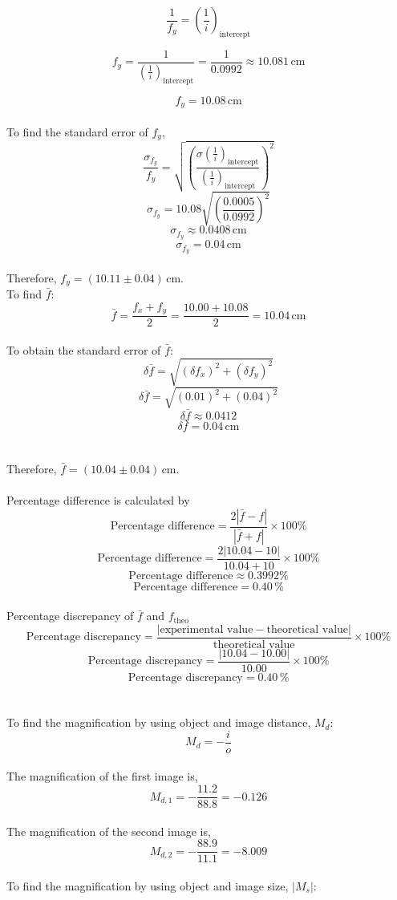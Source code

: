 \documentclass[a4paper,11pt]{article}
\begin{document}
\[ \frac{1}{f_y} = (\frac{1}{i})_{\text{intercept}} \]

\[ f_y = \frac{1}{(\frac{1}{i})_{\text{intercept}}} = \frac{1}{0.0992} \approx 10.081\, \text{cm} \]

\[ f_y = 10.08\, \text{cm} \]
~\\
To find the standard error of $f_y$,
\[ \frac{\sigma_{f_y}}{f_y} = \sqrt{\left( \frac{\sigma(\frac{1}{i})_{\text{intercept}}}{(\frac{1}{i})_{\text{intercept}}} \right)^2} \]
\[ \sigma_{f_y}= 10.08\sqrt{\left( \frac{0.0005}{0.0992} \right)^2} \]
\[ \sigma_{f_y}\approx 0.0408\, \text{cm} \]
\[ \sigma_{f_y} = 0.04\, \text{cm} \]
~\\
Therefore, $f_y = (10.11 \pm 0.04)\, \text{cm}$.
~\\
To find $\bar{f}$:
\[ \bar{f} = \frac{f_x + f_y}{2} = \frac{10.00 + 10.08}{2} = 10.04\,\text{cm} \]
~\\
To obtain the standard error of $\bar{f}$:
\[ \delta \bar{f} = \sqrt{(\delta f_x)^2 + (\delta f_y)^2} \]
\[ \delta \bar{f} = \sqrt{(0.01)^2 + (0.04)^2} \]
\[ \delta \bar{f} \approx  0.0412 \]
\[ \delta \bar{f} = 0.04 \, \text{cm} \]\\
\\
Therefore, $\bar{f} = (10.04 \pm 0.04)\, \text{cm}$.\\
\\
Percentage difference is calculated by
\[ \text{Percentage difference} = \frac{2|\bar{f} - f|}{|\bar{f} + f|} \times 100\% \]
\[ \text{Percentage difference} = \frac{2|10.04-10|}{10.04+10} \times 100\% \]
\[ \text{Percentage difference} \approx 0.3992\% \]
\[ \text{Percentage difference} =0.40\,\% \]
\\
Percentage discrepancy of $\bar{f}$ and $f_{\text{theo}}$
\[ \text{Percentage discrepancy} = \frac{|\text{experimental value} - \text{theoretical value}|}{\text{theoretical value}} \times 100\% \]
\[ \text{Percentage discrepancy} = \frac{|10.04-10.00|}{10.00} \times 100\% \]
\[ \text{Percentage discrepancy} = 0.40\,\% \]\\
\\
To find the magnification by using object and image distance, \( M_d \):
\[ M_d = -\frac{i}{o} \]
~\\
The magnification of the first image is,
\[ M_{d,1} = -\frac{11.2}{88.8} = -0.126 \]
~\\
The magnification of the second image is,
\[ M_{d,2} = -\frac{88.9}{11.1} = -8.009 \]
~\\
To find the magnification by using object and image size, \( |M_s| \):
\end{document}
